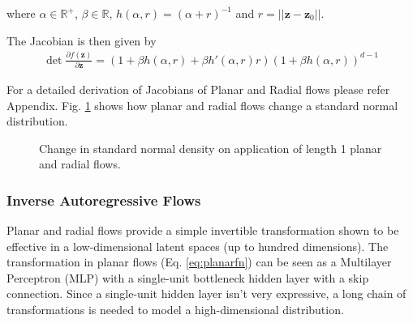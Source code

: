 \documentclass[runningheads]{llncs}
\begin{document}
where $\alpha \in \mathbb{R}^+$, $\beta \in \mathbb{R}$, $h(\alpha,r) = (\alpha + r)^{-1}$ and $r = \vert\vert\mathbf{z} - \mathbf{z}_0\vert\vert$.

The Jacobian is then given by
\begin{align}
\det\frac{\partial f(\mathbf{z})}{\partial \mathbf{z}} = \left(1 + \beta h(\alpha,r) + \beta h'(\alpha,r)r\right)(1+\beta h(\alpha,r))^{d-1}
\end{align}

For a detailed derivation of Jacobians of Planar and Radial flows please refer Appendix. Fig. \ref{fig:planarradial} shows how planar and radial flows change a standard normal distribution.

\begin{figure}
	\centering
	\caption{Change in standard normal density on application of length 1 planar and radial flows.}
	\label{fig:planarradial}
\end{figure}

\subsubsection{Inverse Autoregressive Flows} Planar and radial flows provide a simple invertible transformation shown to be effective in a low-dimensional latent spaces (up to hundred dimensions). The transformation in planar flows (Eq. \ref{eq:planarfn}) can be seen as a Multilayer Perceptron (MLP) with a single-unit bottleneck hidden layer with a skip connection. Since a single-unit hidden layer isn't very expressive, a long chain of transformations is needed to model a high-dimensional distribution. 
\end{document}
